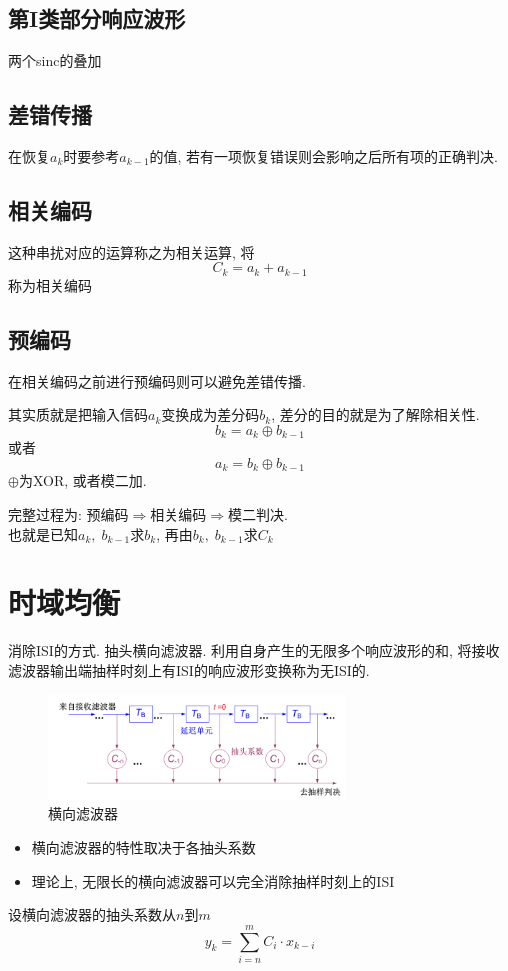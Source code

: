 \documentclass[a4paper]{report}
\begin{document}
\subsection{第I类部分响应波形}
两个sinc的叠加
\subsection{差错传播}
在恢复$a_k$时要参考$a_{k-1}$的值, 若有一项恢复错误则会影响之后所有项的正确判决. 
\subsection{相关编码}
这种串扰对应的运算称之为相关运算, 将\begin{equation}
  C_k=a_k+a_{k-1}
\end{equation}
称为相关编码
\subsection{预编码}
在相关编码之前进行预编码则可以避免差错传播. 

其实质就是把输入信码$a_k$变换成为差分码$b_k$, 差分的目的就是为了解除相关性. 
\begin{equation}
  b_k=a_k\oplus b_{k-1}
\end{equation}
或者
\begin{equation}
  a_k=b_k\oplus b_{k-1}
\end{equation}
$\oplus$为XOR, 或者模二加. 

完整过程为: 预编码$\Rightarrow$相关编码$\Rightarrow$模二判决. \\ 也就是已知$a_k,\; b_{k-1}$求$b_k$, 再由$b_k,\; b_{k-1}$求$C_k$
\section{时域均衡}
消除ISI的方式. 抽头横向滤波器. 利用自身产生的无限多个响应波形的和, 将接收滤波器输出端抽样时刻上有ISI的响应波形变换称为无ISI的. 
\begin{figure}[H]
\centering
\includegraphics[width=0.7\textwidth]{transversal_filter.png}
\caption{横向滤波器}
\end{figure}
\begin{itemize}
  \item 横向滤波器的特性取决于各抽头系数
  \item 理论上, 无限长的横向滤波器可以完全消除抽样时刻上的ISI
\end{itemize}
设横向滤波器的抽头系数从$n$到$m$
\begin{equation}
  y_k=\displaystyle\sum_{i=n}^{m}C_i\cdot x_{k-i}
\end{equation}
\end{document}
